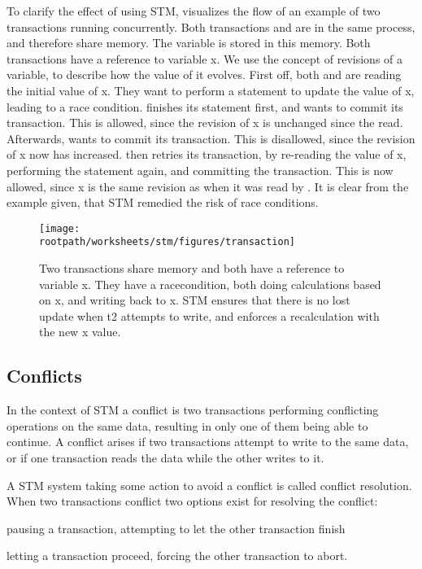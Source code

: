 To clarify the effect of using \ac{STM},  visualizes the flow of an example of two transactions running concurrently. Both transactions  and  are in the same process, and therefore share memory. The variable  is stored in this memory. Both transactions have a reference to variable x. We use the concept of revisions of a variable, to describe how the value of it evolves. First off, both  and  are reading the initial value of x. They want to perform a statement to update the value of x, leading to a race condition.  finishes its statement first, and wants to commit its transaction. This is allowed, since the revision of x is unchanged since the read. Afterwards,  wants to commit its transaction. This is disallowed, since the revision of x now has increased.  then retries its transaction, by re-reading the value of x, performing the statement again, and committing the transaction. This is now allowed, since x is the same revision as when it was read by . It is clear from the example given, that \ac{STM} remedied the risk of race conditions.

\begin{figure}[h!]
\centering
\texttt{[image: \\rootpath/worksheets/stm/figures/transaction]}
\caption{Two transactions share memory and both have a reference to variable x. They have a racecondition, both doing calculations based on x, and writing back to x. \ac{STM} ensures that there is no lost update when t2 attempts to write, and enforces a recalculation with the new x value.}\label{fig:transaction}
\end{figure}

\subsection{Conflicts}
\label{sec:stm_conflicts}
In the context of \ac{STM} a conflict is two transactions performing conflicting operations on the same data, resulting in only one of them being able to continue\cite[p. 20]{harris2010transactional}. A conflict arises if two transactions attempt to write to the same data, or if one transaction reads the data while the other writes to it.

A \ac{STM} system taking some action to avoid a conflict is called conflict resolution\cite[p. 20]{harris2010transactional}. When two transactions conflict two options exist for resolving the conflict:\begin{inparaenum}[(1)]
\item pausing a transaction, attempting to let the other transaction finish
\item letting a transaction proceed, forcing the other transaction to abort.
\end{inparaenum} 
